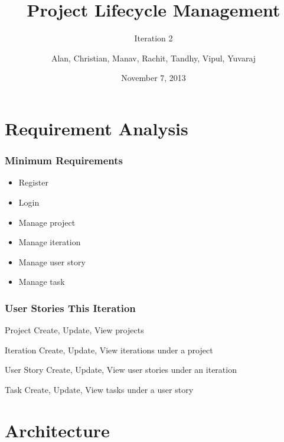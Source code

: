 \documentclass[final]{beamer}
\title[PLM] %
{Project Lifecycle Management}
\subtitle{Iteration 2}
\author[] %
{Alan, Christian, Manav, Rachit, Tandhy, Vipul, Yuvaraj}
\date[November 7, 2013] %
{November 7, 2013}
\begin{document}
\begin{frame}
	\titlepage
\end{frame}

\section{Requirement Analysis}

\begin{frame}
	\frametitle{Minimum Requirements}
	\begin{beamerboxesrounded}[shadow]{}
		\begin{itemize}
			\item{Register}
			\item{Login}
			\item{Manage project}
			\item{Manage iteration}
			\item{Manage user story}
			\item{Manage task}
		\end{itemize}
	\end{beamerboxesrounded}
\end{frame}

\begin{frame}
	\frametitle{User Stories This Iteration}
	\begin{beamerboxesrounded}[shadow]{Project}
		Create, Update, View projects
	\end{beamerboxesrounded}

	\begin{beamerboxesrounded}[shadow]{Iteration}
		Create, Update, View iterations under a project
	\end{beamerboxesrounded}

	\begin{beamerboxesrounded}[shadow]{User Story}
		Create, Update, View user stories under an iteration
	\end{beamerboxesrounded}

	\begin{beamerboxesrounded}[shadow]{Task}
		Create, Update, View tasks under a user story
	\end{beamerboxesrounded}
\end{frame}

\section{Architecture}
\end{document}
